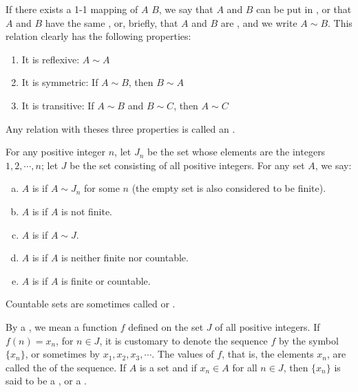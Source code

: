 \begin{deff}
	If there exists a 1-1 mapping of $A$ {} $B$, we say that $A$ and $B$ can be put in {}, or that $A$ and $B$ have the same {}, or, briefly, that $A$ and $B$ are {}, and we write $A \sim B$. This relation clearly has the following properties:
	\begin{enumerate}[]
		\item It is reflexive: $A \sim A$
		\item It is symmetric: If $A \sim B$, then $B \sim A$
		\item It is transitive: If $A \sim B$ and $B \sim C$, then $A \sim C$
	\end{enumerate}
	Any relation with theses three properties is called an {}.
\end{deff}

\begin{deff}
	For any positive integer $n$, let $J_n$ be the set whose elements are the integers $1,2,\cdots,n$; let $J$ be the set consisting of all positive integers. For any set $A$, we say:
	\begin{enumerate}[(a)]
		\item $A$ is {} if $A \sim J_n$ for some $n$ (the empty set is also considered to be finite).
		\item $A$ is {} if $A$ is not finite.
		\item $A$ is {} if $A \sim J$.
		\item $A$ is {} if $A$ is neither finite nor countable.
		\item $A$ is {} if $A$ is finite or countable.
	\end{enumerate}
	Countable sets are sometimes called {} or {}.
\end{deff}

\begin{deff}
	By a {}, we mean a function $f$ defined on the set $J$ of all positive integers. If $f(n) = x_n$, for $n \in J$, it is customary to denote the sequence $f$ by the symbol $\{x_n\}$, or sometimes by $x_1, x_2, x_3, \cdots$. The values of $f$, that is, the elements $x_n$, are called the {} of the sequence. If $A$ is a set and if $x_n \in A$ for all $n \in J$, then $\{x_n\}$ is said to be a {}, or a {}.
\end{deff}

